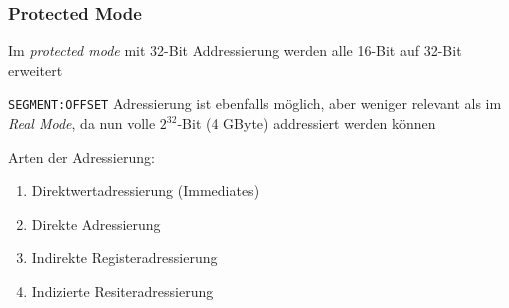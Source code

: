 \subsubsection{Protected Mode}
Im \emph{protected mode} mit 32-Bit Addressierung werden alle 16-Bit auf 32-Bit erweitert

\texttt{SEGMENT:OFFSET} Adressierung ist ebenfalls möglich, aber weniger relevant als im
\emph{Real Mode}, da nun volle $2^{32}$-Bit (4 GByte) addressiert werden können




Arten der Adressierung:

\begin{enumerate}
\item Direktwertadressierung (Immediates)
\item Direkte Adressierung
\item Indirekte Registeradressierung
\item Indizierte Resiteradressierung
\end{enumerate}


